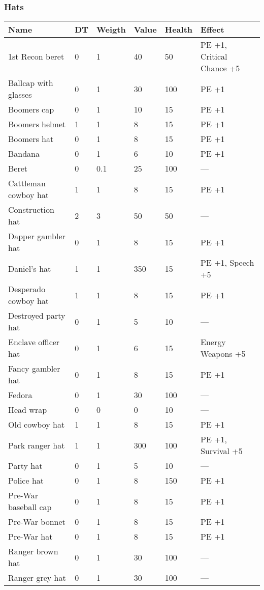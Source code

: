 
\subsubsection{Hats}
\begin{longtable}{|p{4cm}|p{1.2cm}|p{1.2cm}|p{1.2cm}|p{1.2cm}|p{6cm}|}
\hline
\bfseries Name & \bfseries DT & \bfseries Weigth & \bfseries Value & \bfseries Health & \bfseries Effect \\
\hline
\endhead
1st Recon beret & 0 & 1 & 40 & 50 & PE +1, Critical Chance +5 \\
Ballcap with glasses & 0 & 1 & 30 & 100 & PE +1 \\
Boomers cap & 0 & 1 & 10 & 15 & PE +1 \\
Boomers helmet & 1 & 1 & 8 & 15 & PE +1 \\
Boomers hat & 0 & 1 & 8 & 15 & PE +1 \\
Bandana & 0 & 1 & 6 & 10 & PE +1 \\
Beret & 0 & 0.1 & 25 & 100 & — \\
Cattleman cowboy hat & 1 & 1 & 8 & 15 & PE +1 \\
Construction hat & 2 & 3 & 50 & 50 & — \\
Dapper gambler hat & 0 & 1 & 8 & 15 & PE +1 \\
Daniel's hat & 1 & 1 & 350 & 15 & PE +1, Speech +5 \\
Desperado cowboy hat & 1 & 1 & 8 & 15 & PE +1 \\
Destroyed party hat & 0 & 1 & 5 & 10 & — \\
Enclave officer hat & 0 & 1 & 6 & 15 & Energy Weapons +5 \\
Fancy gambler hat & 0 & 1 & 8 & 15 & PE +1 \\
Fedora & 0 & 1 & 30 & 100 & — \\
Head wrap & 0 & 0 & 0 & 10 & — \\
Old cowboy hat & 1 & 1 & 8 & 15 & PE +1 \\
Park ranger hat & 1 & 1 & 300 & 100 & PE +1, Survival +5 \\
Party hat & 0 & 1 & 5 & 10 & — \\
Police hat & 0 & 1 & 8 & 150 & PE +1 \\
Pre-War baseball cap & 0 & 1 & 8 & 15 & PE +1 \\
Pre-War bonnet & 0 & 1 & 8 & 15 & PE +1 \\
Pre-War hat & 0 & 1 & 8 & 15 & PE +1 \\
Ranger brown hat & 0 & 1 & 30 & 100 & — \\
Ranger grey hat & 0 & 1 & 30 & 100 & — \\

\end{longtable}
